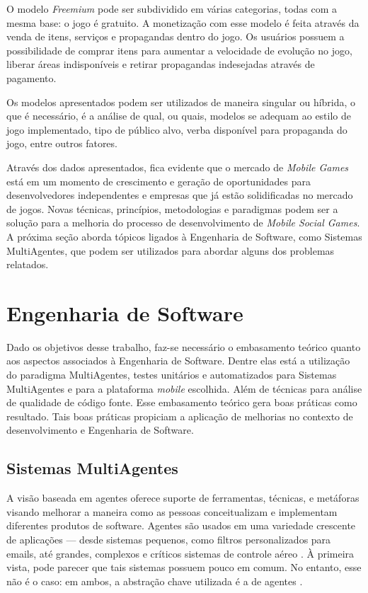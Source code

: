 O modelo \textit{Freemium} pode ser subdividido em várias categorias, todas com
a mesma base: o jogo é gratuito. A monetização com esse modelo é feita através
da venda de itens, serviços e propagandas dentro do jogo. Os usuários possuem a
possibilidade de comprar itens para aumentar a velocidade de evolução no jogo,
liberar áreas indisponíveis e retirar propagandas indesejadas através de
pagamento.

Os modelos apresentados podem ser utilizados de maneira singular ou híbrida, o
que é necessário, é a análise de qual, ou quais, modelos se adequam ao estilo
de jogo implementado, tipo de público alvo, verba disponível para propaganda do
jogo, entre outros fatores.

Através dos dados apresentados, fica evidente que o mercado de \textit{Mobile
Games} está em um momento de crescimento e geração de oportunidades para
desenvolvedores independentes e empresas que já estão solidificadas no mercado
de jogos. Novas técnicas, princípios, metodologias e paradigmas podem ser a
solução para a melhoria do processo de desenvolvimento de \textit{Mobile
Social Games}. A próxima seção aborda tópicos ligados à Engenharia de
Software, como Sistemas MultiAgentes, que podem ser utilizados para abordar
alguns dos problemas relatados.

\section{Engenharia de Software}
\label{sec:refengdesoftware}

Dado os objetivos desse trabalho, faz-se necessário o embasamento teórico
quanto aos aspectos associados à Engenharia de Software. Dentre elas está a
utilização do paradigma MultiAgentes, testes unitários e automatizados para
Sistemas MultiAgentes e para a plataforma \textit{mobile} escolhida. Além de
técnicas para análise de qualidade de código fonte. Esse embasamento teórico
gera boas práticas como resultado. Tais boas práticas propiciam a aplicação de
melhorias no contexto de desenvolvimento e Engenharia de Software.

  \subsection{Sistemas MultiAgentes}
  \label{sec:refsistemasmultiagentes}

A visão baseada em agentes oferece suporte de ferramentas, técnicas, e
metáforas visando melhorar a maneira como as pessoas conceitualizam e
implementam diferentes produtos de software. Agentes são usados em uma
variedade crescente de aplicações — desde sistemas pequenos, como filtros
personalizados para emails, até grandes, complexos e críticos sistemas de
controle aéreo \cite{jade}. À primeira vista, pode parecer que tais sistemas
possuem pouco em comum. No entanto, esse não é o caso: em ambos, a abstração
chave utilizada é a de agentes \cite{jennings1998}.

